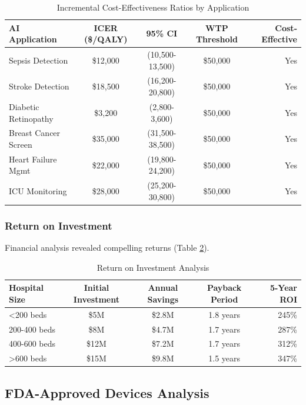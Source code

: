 \documentclass[12pt,letterpaper]{article}
\begin{document}
\begin{table}[H]
\centering
\caption{Incremental Cost-Effectiveness Ratios by Application}
\label{tab:cost_effectiveness}
\begin{tabular}{@{}lcccr@{}}
\toprule
\textbf{AI Application} & \textbf{ICER (\$/QALY)} & \textbf{95\% CI} & \textbf{WTP Threshold} & \textbf{Cost-Effective} \\
\midrule
Sepsis Detection & \$12,000 & (10,500-13,500) & \$50,000 & Yes \\
Stroke Detection & \$18,500 & (16,200-20,800) & \$50,000 & Yes \\
Diabetic Retinopathy & \$3,200 & (2,800-3,600) & \$50,000 & Yes \\
Breast Cancer Screen & \$35,000 & (31,500-38,500) & \$50,000 & Yes \\
Heart Failure Mgmt & \$22,000 & (19,800-24,200) & \$50,000 & Yes \\
ICU Monitoring & \$28,000 & (25,200-30,800) & \$50,000 & Yes \\
\bottomrule
\end{tabular}
\end{table}

\subsubsection{Return on Investment}

Financial analysis revealed compelling returns (Table \ref{tab:roi}).

\begin{table}[H]
\centering
\caption{Return on Investment Analysis}
\label{tab:roi}
\begin{tabular}{@{}lcccr@{}}
\toprule
\textbf{Hospital Size} & \textbf{Initial Investment} & \textbf{Annual Savings} & \textbf{Payback Period} & \textbf{5-Year ROI} \\
\midrule
<200 beds & \$5M & \$2.8M & 1.8 years & 245\% \\
200-400 beds & \$8M & \$4.7M & 1.7 years & 287\% \\
400-600 beds & \$12M & \$7.2M & 1.7 years & 312\% \\
>600 beds & \$15M & \$9.8M & 1.5 years & 347\% \\
\bottomrule
\end{tabular}
\end{table}

\subsection{FDA-Approved Devices Analysis}
\end{document}
